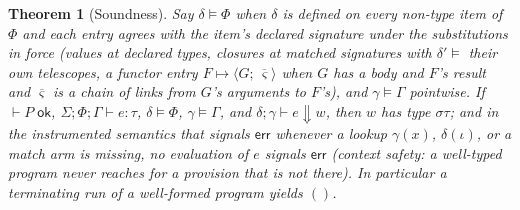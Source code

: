 \documentclass[10pt]{article}
\newcommand{\ov}[1]{\overline{#1}}
\newcommand{\ksf}[1]{\mathsf{#1}}         %
\newcommand{\wf}{\;\ksf{ok}}
\newcommand{\Eval}{\Downarrow}
\newcommand{\unitv}{()}
\theoremstyle{plain}
\newtheorem{theorem}{Theorem}[section]
\theoremstyle{remark}
\begin{document}
\begin{theorem}[Soundness]\label{thm:sound}
Say $\delta \models \Phi$ when $\delta$ is defined on every non-type item
of $\Phi$ and each entry agrees with the item's declared signature under
the substitutions in force (values at declared types, closures at matched
signatures with $\delta' \models$ their own telescopes, a functor entry
$F \mapsto \langle G;\, \ov{\varsigma} \rangle$ when $G$ has a body and
$F$'s result and $\ov{\varsigma}$ is a chain of links from $G$'s
arguments to $F$'s), and $\gamma \models \Gamma$ pointwise. If\, $\vdash P \wf$,\;
$\Sigma;\Phi;\Gamma \vdash e : \tau$,\; $\delta \models \Phi$,\;
$\gamma \models \Gamma$, and $\delta;\gamma \vdash e \Eval w$, then
$w$ has type $\sigma\tau$; and in the instrumented semantics that signals
$\ksf{err}$ whenever a lookup $\gamma(x)$, $\delta(\iota)$, or a match
arm is missing, no evaluation of $e$ signals $\ksf{err}$
(\emph{context safety}: a well-typed program never reaches for a
provision that is not there). In particular a terminating run of a
well-formed program yields $\unitv$.
\end{theorem}
\end{document}
